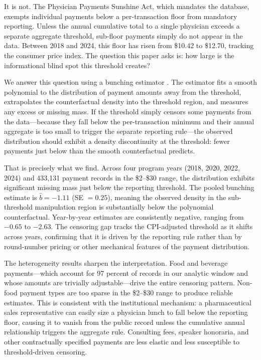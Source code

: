 \documentclass[12pt]{article}
\begin{document}
It is not. The Physician Payments Sunshine Act, which mandates the database, exempts individual payments below a per-transaction floor from mandatory reporting. Unless the annual cumulative total to a single physician exceeds a separate aggregate threshold, sub-floor payments simply do not appear in the data. Between 2018 and 2024, this floor has risen from \$10.42 to \$12.70, tracking the consumer price index. The question this paper asks is: how large is the informational blind spot this threshold creates?

We answer this question using a bunching estimator \citep{saez2010taxpayers, kleven2016bunching}. The estimator fits a smooth polynomial to the distribution of payment amounts away from the threshold, extrapolates the counterfactual density into the threshold region, and measures any excess or missing mass. If the threshold simply censors some payments from the data---because they fall below the per-transaction minimum and their annual aggregate is too small to trigger the separate reporting rule---the observed distribution should exhibit a density discontinuity at the threshold: fewer payments just below than the smooth counterfactual predicts.

That is precisely what we find. Across four program years (2018, 2020, 2022, 2024) and 433,131 payment records in the \$2--\$30 range, the distribution exhibits significant missing mass just below the reporting threshold. The pooled bunching estimate is $\hat{b} = -1.11$ (SE $= 0.25$), meaning the observed density in the sub-threshold manipulation region is substantially below the polynomial counterfactual. Year-by-year estimates are consistently negative, ranging from $-0.65$ to $-2.63$. The censoring gap tracks the CPI-adjusted threshold as it shifts across years, confirming that it is driven by the reporting rule rather than by round-number pricing or other mechanical features of the payment distribution.

The heterogeneity results sharpen the interpretation. Food and beverage payments---which account for 97 percent of records in our analytic window and whose amounts are trivially adjustable---drive the entire censoring pattern. Non-food payment types are too sparse in the \$2--\$30 range to produce reliable estimates. This is consistent with the institutional mechanism: a pharmaceutical sales representative can easily size a physician lunch to fall below the reporting floor, causing it to vanish from the public record unless the cumulative annual relationship triggers the aggregate rule. Consulting fees, speaker honoraria, and other contractually specified payments are less elastic and less susceptible to threshold-driven censoring.
\end{document}
